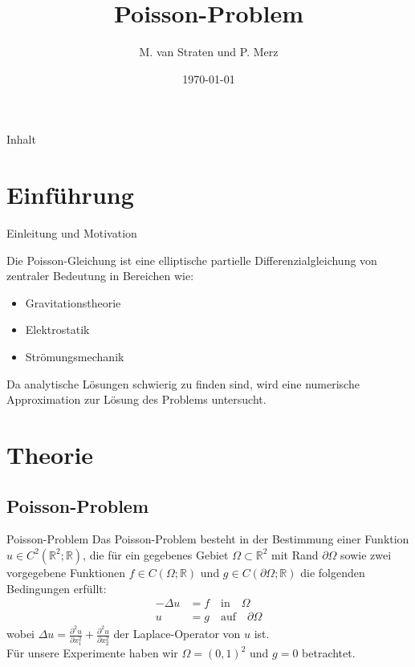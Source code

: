 \documentclass[9pt, t]{beamer}
\title{Poisson-Problem}
\author{M. van Straten und P. Merz}
\institute{Humboldt-Universität zu Berlin \\
           Wintersemester 2024}
\date{\today}
\begin{document}
\maketitle

\begin{frame}{Inhalt}
    \tableofcontents[pausesections]
\end{frame}

\section{Einführung}

\begin{frame}{Einleitung und Motivation}

    Die Poisson-Gleichung ist eine elliptische partielle Differenzialgleichung
    von zentraler Bedeutung in Bereichen wie:

    \begin{itemize}
        \item Gravitationstheorie
        \item Elektrostatik
        \item Strömungsmechanik
    \end{itemize}

    Da analytische Lösungen schwierig zu finden sind, wird eine numerische
    Approximation zur Lösung des Problems untersucht.
\end{frame}

\section{Theorie}

\subsection{Poisson-Problem}

\begin{frame}{Poisson-Problem}
    Das Poisson-Problem besteht in der Bestimmung einer Funktion \(u \in
    C^2(\mathbb{R}^2; \mathbb{R})\), die für ein gegebenes Gebiet \(\Omega
    \subset \mathbb{R}^2\) mit Rand \(\partial \Omega\) sowie zwei vorgegebene
    Funktionen \(f \in C(\Omega; \mathbb{R})\) und \(g \in C(\partial \Omega;
    \mathbb{R})\) die folgenden Bedingungen erfüllt:
    \begin{align*}
        -\Delta u & = f \quad \text{in} \quad \Omega
        \\
        u         & = g \quad \text{auf} \quad \partial \Omega
    \end{align*}
    wobei \(\Delta u = \frac{\partial^2 u}{\partial x_1^2} + \frac{\partial^2
        u}{\partial x_2^2}\) der Laplace-Operator von \(u\) ist. \\ Für unsere
    Experimente haben wir \(\Omega = {(0, 1)^2}\) und \(g = 0\) betrachtet.
\end{frame}
\end{document}
